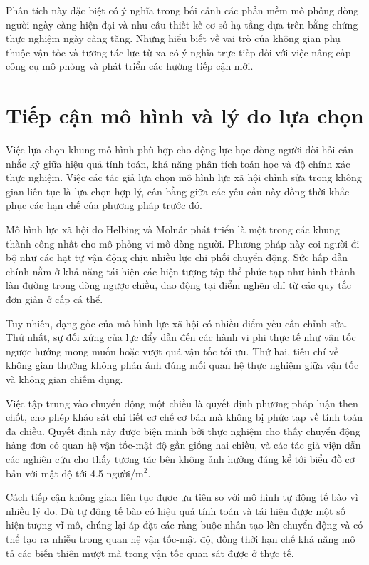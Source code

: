 \documentclass[12pt,a4paper]{article}
\begin{document}
Phân tích này đặc biệt có ý nghĩa trong bối cảnh các phần mềm mô phỏng dòng người ngày càng hiện đại và nhu cầu thiết kế cơ sở hạ tầng dựa trên bằng chứng thực nghiệm ngày càng tăng. Những hiểu biết về vai trò của không gian phụ thuộc vận tốc và tương tác lực từ xa có ý nghĩa trực tiếp đối với việc nâng cấp công cụ mô phỏng và phát triển các hướng tiếp cận mới.

\section{Tiếp cận mô hình và lý do lựa chọn}

Việc lựa chọn khung mô hình phù hợp cho động lực học dòng người đòi hỏi cân nhắc kỹ giữa hiệu quả tính toán, khả năng phân tích toán học và độ chính xác thực nghiệm. Việc các tác giả lựa chọn mô hình lực xã hội chỉnh sửa trong không gian liên tục là lựa chọn hợp lý, cân bằng giữa các yêu cầu này đồng thời khắc phục các hạn chế của phương pháp trước đó.

Mô hình lực xã hội do Helbing và Molnár phát triển là một trong các khung thành công nhất cho mô phỏng vi mô dòng người. Phương pháp này coi người đi bộ như các hạt tự vận động chịu nhiều lực chi phối chuyển động. Sức hấp dẫn chính nằm ở khả năng tái hiện các hiện tượng tập thể phức tạp như hình thành làn đường trong dòng ngược chiều, dao động tại điểm nghẽn chỉ từ các quy tắc đơn giản ở cấp cá thể.

Tuy nhiên, dạng gốc của mô hình lực xã hội có nhiều điểm yếu cần chỉnh sửa. Thứ nhất, sự đối xứng của lực đẩy dẫn đến các hành vi phi thực tế như vận tốc ngược hướng mong muốn hoặc vượt quá vận tốc tối ưu. Thứ hai, tiêu chí về không gian thường không phản ánh đúng mối quan hệ thực nghiệm giữa vận tốc và không gian chiếm dụng.

Việc tập trung vào chuyển động một chiều là quyết định phương pháp luận then chốt, cho phép khảo sát chi tiết cơ chế cơ bản mà không bị phức tạp về tính toán đa chiều. Quyết định này được biện minh bởi thực nghiệm cho thấy chuyển động hàng đơn có quan hệ vận tốc-mật độ gần giống hai chiều, và các tác giả viện dẫn các nghiên cứu cho thấy tương tác bên không ảnh hưởng đáng kể tới biểu đồ cơ bản với mật độ tới 4.5 người/m$^2$.

Cách tiếp cận không gian liên tục được ưu tiên so với mô hình tự động tế bào vì nhiều lý do. Dù tự động tế bào có hiệu quả tính toán và tái hiện được một số hiện tượng vĩ mô, chúng lại áp đặt các ràng buộc nhân tạo lên chuyển động và có thể tạo ra nhiễu trong quan hệ vận tốc-mật độ, đồng thời hạn chế khả năng mô tả các biến thiên mượt mà trong vận tốc quan sát được ở thực tế.
\end{document}
